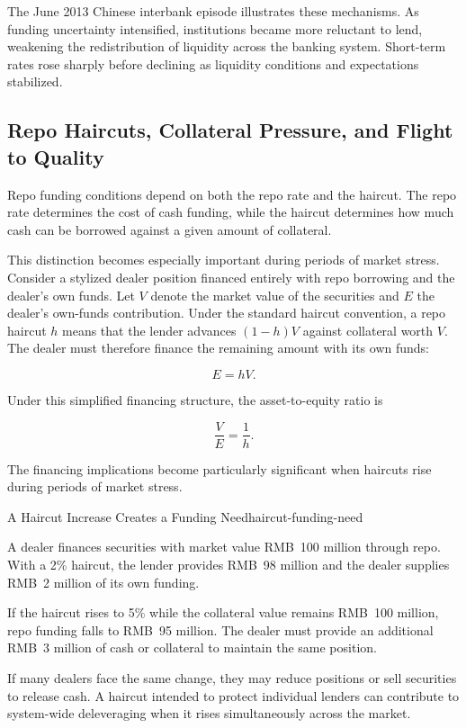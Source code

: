 The June 2013 Chinese interbank episode illustrates these
mechanisms. As funding uncertainty intensified,
institutions became more reluctant to lend, weakening
the redistribution of liquidity across the banking
system. Short-term rates rose sharply before declining
as liquidity conditions and expectations stabilized.

\subsection{Repo Haircuts, Collateral Pressure, and Flight to Quality}

Repo funding conditions depend on both the repo rate and the haircut. The repo rate determines the cost of cash funding, while the haircut determines how much cash can be borrowed against a given amount of collateral.

This distinction becomes especially important during
periods of market stress. Consider a stylized dealer
position financed entirely with repo borrowing and
the dealer's own funds. Let $V$ denote the market
value of the securities and $E$ the dealer's own-funds
contribution. Under the standard haircut convention,
a repo haircut $h$ means that the lender advances
$(1-h)V$ against collateral worth $V$. The dealer
must therefore finance the remaining amount with
its own funds:

\begin{equation*}
E=hV.
\label{eq:ch7-haircut-equity}
\end{equation*}

Under this simplified financing structure, the asset-to-equity ratio is

\begin{equation*}
\frac{V}{E}=\frac{1}{h}.
\label{eq:ch7-haircut-leverage}
\end{equation*}

The financing implications become particularly
significant when haircuts rise during periods of
market stress.

\begin{example}{A Haircut Increase Creates a Funding Need}{haircut-funding-need}

A dealer finances securities with market value RMB~100 million through repo. With a 2\% haircut, the lender provides RMB~98 million and the dealer supplies RMB~2 million of its own funding.

If the haircut rises to 5\% while the collateral value remains RMB~100 million, repo funding falls to RMB~95 million. The dealer must provide an additional RMB~3 million of cash or collateral to maintain the same position.

If many dealers face the same change, they may reduce positions or sell securities to release cash. A haircut intended to protect individual lenders can contribute to system-wide deleveraging when it rises simultaneously across the market.

\end{example}

